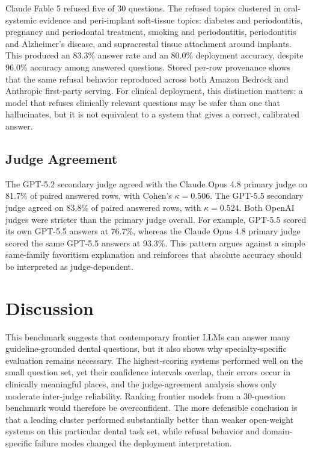 \documentclass[11pt]{article}
\begin{document}
Claude Fable 5 refused five of 30 questions.
The refused topics clustered in oral-systemic evidence and peri-implant soft-tissue topics: diabetes and periodontitis, pregnancy and periodontal treatment, smoking and periodontitis, periodontitis and Alzheimer's disease, and supracrestal tissue attachment around implants.
This produced an 83.3\% answer rate and an 80.0\% deployment accuracy, despite 96.0\% accuracy among answered questions.
Stored per-row provenance shows that the same refusal behavior reproduced across both Amazon Bedrock and Anthropic first-party serving.
For clinical deployment, this distinction matters: a model that refuses clinically relevant questions may be safer than one that hallucinates, but it is not equivalent to a system that gives a correct, calibrated answer.

\subsection{Judge Agreement}

The GPT-5.2 secondary judge agreed with the Claude Opus 4.8 primary judge on 81.7\% of paired answered rows, with Cohen's $\kappa=0.506$.
The GPT-5.5 secondary judge agreed on 83.8\% of paired answered rows, with $\kappa=0.524$.
Both OpenAI judges were stricter than the primary judge overall.
For example, GPT-5.5 scored its own GPT-5.5 answers at 76.7\%, whereas the Claude Opus 4.8 primary judge scored the same GPT-5.5 answers at 93.3\%.
This pattern argues against a simple same-family favoritism explanation and reinforces that absolute accuracy should be interpreted as judge-dependent.

\section{Discussion}

This benchmark suggests that contemporary frontier LLMs can answer many guideline-grounded dental questions, but it also shows why specialty-specific evaluation remains necessary.
The highest-scoring systems performed well on the small question set, yet their confidence intervals overlap, their errors occur in clinically meaningful places, and the judge-agreement analysis shows only moderate inter-judge reliability.
Ranking frontier models from a 30-question benchmark would therefore be overconfident.
The more defensible conclusion is that a leading cluster performed substantially better than weaker open-weight systems on this particular dental task set, while refusal behavior and domain-specific failure modes changed the deployment interpretation.
\end{document}
